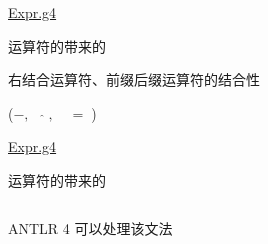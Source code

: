 \begin{frame}{}
  \begin{center}
    {\Large \href{https://github.com/courses-at-nju-by-hfwei/compilers-antlr/blob/main/src/main/antlr/expr/Expr.g4}{Expr.g4}}
  \end{center}

  \begin{center}
    运算符的带来的
  \end{center}
\end{frame}

\begin{frame}{}
  \begin{center}
    右结合运算符、前缀后缀运算符的结合性

    \vspace{0.20cm}
    ({$-, \quad \hat{}\;, \quad = \;$})
  \end{center}
\end{frame}

\begin{frame}{}
  \begin{center}
    {\Large \href{https://github.com/courses-at-nju-by-hfwei/compilers-antlr/blob/main/src/main/antlr/expr/Expr.g4}{Expr.g4}}
  \end{center}


  \begin{center}
    运算符的带来的
  \end{center}
\end{frame}

\begin{frame}{}
  \begin{columns}
      \vspace{0.20cm}
      \begin{center}
        ANTLR 4 可以处理该文法
      \end{center}
  \end{columns}
\end{frame}


